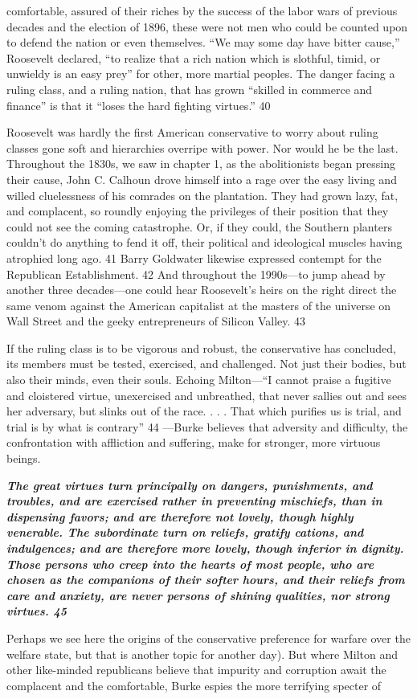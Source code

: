 comfortable, assured of their riches by the success of the labor wars of previous decades and the election of 1896, these were not men who could be counted upon to defend the nation or even themselves. “We may some day have bitter cause,” Roosevelt declared, “to realize that a rich nation which is slothful, timid, or unwieldy is an easy prey” for other, more martial peoples. The danger facing a ruling class, and a ruling nation, that has grown “skilled in commerce and finance” is that it “loses the hard fighting virtues.” {\color{blue} 40 } {\par} Roosevelt was hardly the first American conservative to worry about ruling classes gone soft and hierarchies overripe with power. Nor would he be the last. Throughout the 1830s, we saw in chapter 1, as the abolitionists began pressing their cause, John C. Calhoun drove himself into a rage over the easy living and willed cluelessness of his comrades on the plantation. They had grown lazy, fat, and complacent, so roundly enjoying the privileges of their position that they could not see the coming catastrophe. Or, if they could, the Southern planters couldn’t do anything to fend it off, their political and ideological muscles having atrophied long ago. {\color{blue} 41 } Barry Goldwater likewise expressed contempt for the Republican Establishment. {\color{blue} 42 } And throughout the 1990s—to jump ahead by another three decades—one could hear Roosevelt’s heirs on the right direct the same venom against the American capitalist at the masters of the universe on Wall Street and the geeky entrepreneurs of Silicon Valley. {\color{blue} 43 } {\par} If the ruling class is to be vigorous and robust, the conservative has concluded, its members must be tested, exercised, and challenged. Not just their bodies, but also their minds, even their souls. Echoing Milton—“I cannot praise a fugitive and cloistered virtue, unexercised and unbreathed, that never sallies out and sees her adversary, but slinks out of the race. . . . That which purifies us is trial, and trial is by what is contrary” {\color{blue} 44 } —Burke believes that adversity and difficulty, the confrontation with affliction and suffering, make for stronger, more virtuous beings.{\par} {\textbf{\textit{The great virtues turn principally on dangers, punishments, and troubles, and are exercised rather in preventing mischiefs, than in dispensing favors; and are therefore not lovely, though highly venerable. The subordinate turn on reliefs, gratify cations, and indulgences; and are therefore more lovely, though inferior in dignity. Those persons who creep into the hearts of most people, who are chosen as the companions of their softer hours, and their reliefs from care and anxiety, are never persons of shining qualities, nor strong virtues. {\color{blue} 45 } } } }{\par} Perhaps we see here the origins of the conservative preference for warfare over the welfare state, but that is another topic for another day). But where Milton and other like-minded republicans believe that impurity and corruption await the complacent and the comfortable, Burke espies the more terrifying specter of 